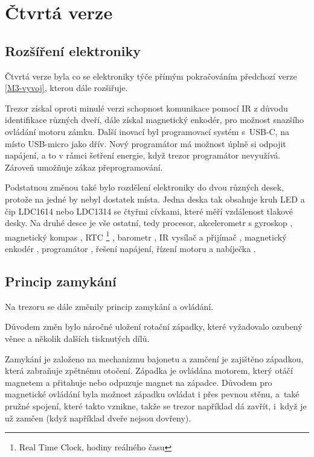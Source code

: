 \section{Čtvrtá verze}

\subsection{Rozšíření elektroniky}

Čtvrtá verze byla co se elektroniky týče přímým pokračováním předchozí verze \ref{M3-vyvoj}, kterou dále rozšiřuje.

Trezor získal oproti minulé verzi schopnost komunikace pomocí IR z důvodu identifikace růz\-ných dveří, dále získal magnetický enkodér, pro možnost snaz\-ší\-ho ovládání
motoru zámku. 
Další inovací byl programovací systém s~USB-C, na místo USB-micro jako dřív. Nový programátor má možnost úplně si odpojit napáje\-ní, a to v rámci šetření 
energie, když trezor programátor nevyužívá. 
Zároveň umožňuje zákaz přeprogramování.

Podstatnou změnou také bylo rozdělení elektroniky do dvou různých desek, protože na jedné by nebyl dostatek místa. Jedna deska  
tak obsahuje kruh LED \parencite{WS2812} a čip LDC1614 \parencite{LDC1614} nebo LDC1314 se čtyřmi cívkami, které měří vzdálenost tlakové desky. Na druhé desce  %
je vše ostatní, tedy procesor\parencite{ESP32}, akcelerometr s
gyroskop \parencite{bmx055} \parencite{mpu6050}, magnetický kompas \parencite{bmx055} \parencite{qmc5883}, RTC \footnote{Real Time Clock, hodiny reálného času} \parencite{m41t62}, 
barometr \parencite{spl06}, IR vysílač \parencite{ir19-21c/tr8} a přijímač \parencite{irm-h936}, magnetický enkodér \parencite{mh253} \parencite{ss360nt}, programátor \parencite{cp2102},
řešení napájení, řízení motoru a nabíječka \parencite{se9017}. 

\subsection{Princip zamykání}

Na trezoru se dále změnily princip zamykání a ovládání. 

Důvodem změn bylo náročné uložení rotační západky, 
které vyžadovalo ozubený věnec a několik dalších tisknutých dílů.

Zamykání je založeno na mechanizmu bajonetu a zamčení je zajištěno západ\-kou, která zabraňuje zpětnému otočení.
Západka je ovládána motorem, který otáčí magnetem a přitahuje nebo odpuzuje magnet na západce. Důvodem pro magnetické ovládání
byla možnost západku ovládat i přes pevnou stěnu, a~také pružné spojení, které takto vznikne, takže se trezor například dá zavřít, i~když
je už zamčen (když například dveře nejsou dovřeny).

